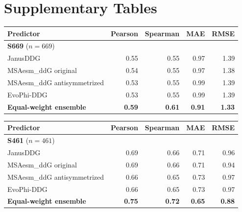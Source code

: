 \noindent\begin{minipage}{\linewidth}
\section*{Supplementary Tables}
\centering\small
{}
\label{tab:s669}
\begin{tabular}{lrrrr}\toprule
Predictor & Pearson & Spearman & MAE & RMSE\\\midrule
\multicolumn{5}{l}{\textbf{S669} ($n=669$)} \\
JanusDDG & 0.55 & 0.55 & 0.97 & 1.39 \\
MSAesm\_ddG original & 0.54 & 0.55 & 0.97 & 1.38 \\
MSAesm\_ddG antisymmetrized & 0.53 & 0.55 & 0.99 & 1.39 \\
EvoPhi-DDG & 0.53 & 0.55 & 0.99 & 1.39 \\
\textbf{Equal-weight ensemble} & \textbf{0.59} & \textbf{0.61} & \textbf{0.91} & \textbf{1.33} \\
\bottomrule\end{tabular}
\end{minipage}\par
\bigskip
\noindent\begin{minipage}{\linewidth}

\centering\small
{}
\label{tab:s461}
\begin{tabular}{lrrrr}\toprule
Predictor & Pearson & Spearman & MAE & RMSE\\\midrule
\multicolumn{5}{l}{\textbf{S461} ($n=461$)} \\
JanusDDG & 0.69 & 0.66 & 0.71 & 0.96 \\
MSAesm\_ddG original & 0.69 & 0.66 & 0.71 & 0.94 \\
MSAesm\_ddG antisymmetrized & 0.66 & 0.65 & 0.73 & 0.97 \\
EvoPhi-DDG & 0.66 & 0.65 & 0.73 & 0.97 \\
\textbf{Equal-weight ensemble} & \textbf{0.75} & \textbf{0.72} & \textbf{0.65} & \textbf{0.88} \\
\bottomrule\end{tabular}
\end{minipage}\par
